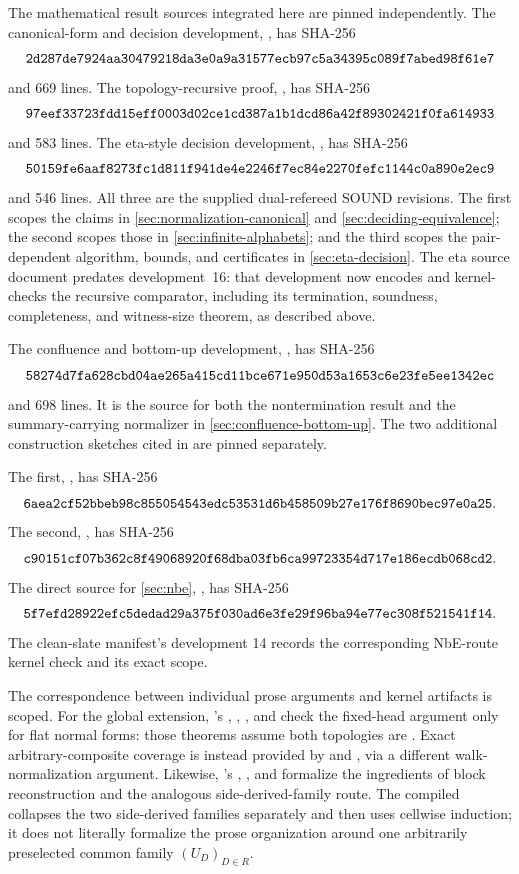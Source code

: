 The mathematical result sources integrated here are pinned independently.  The
canonical-form and decision development, , has
SHA-256
\[
\texttt{2d287de7924aa30479218da3e0a9a31577ecb97c5a34395c089f7abed98f61e7}
\]
and 669 lines.  The topology-recursive proof,
, has SHA-256
\[
\texttt{97eef33723fdd15eff0003d02ce1cd387a1b1dcd86a42f89302421f0fa614933}
\]
and 583 lines.  The eta-style decision development,
, has SHA-256
\[
\texttt{50159fe6aaf8273fc1d811f941de4e2246f7ec84e2270fefc1144c0a890e2ec9}
\]
and 546 lines.  All three are the supplied dual-refereed SOUND revisions.  The
first scopes the claims in \autoref{sec:normalization-canonical} and
\autoref{sec:deciding-equivalence}; the second scopes those in
\autoref{sec:infinite-alphabets}; and the third scopes the pair-dependent
algorithm, bounds, and certificates in \autoref{sec:eta-decision}.  The eta
source document predates development~16: that development now encodes and
kernel-checks the recursive comparator, including its termination, soundness,
completeness, and witness-size theorem, as described above.

The confluence and bottom-up development, , has
SHA-256
\[
\texttt{58274d7fa628cbd04ae265a415cd11bce671e950d53a1653c6e23fe5ee1342ec}
\]
and 698 lines.  It is the source for both the nontermination result and the
summary-carrying normalizer in \autoref{sec:confluence-bottom-up}.  The two
additional construction sketches cited in
 are pinned separately.

The first, , has SHA-256
\[
\texttt{6aea2cf52bbeb98c855054543edc53531d6b458509b27e176f8690bec97e0a25}.
\]
The second, , has SHA-256
\[
\texttt{c90151cf07b362c8f49068920f68dba03fb6ca99723354d717e186ecdb068cd2}.
\]
The direct source for \autoref{sec:nbe}, , has SHA-256
\[
\texttt{5f7efd28922efc5dedad29a375f030ad6e3fe29f96ba94e77ec308f521541f14}.
\]
The clean-slate manifest's development 14 records the corresponding NbE-route
kernel check and its exact scope.

The correspondence between individual prose arguments and kernel artifacts is
scoped.  For the global extension, 's
, , , and  check the
fixed-head argument only for flat normal forms: those theorems assume both
topologies are .  Exact arbitrary-composite coverage is instead
provided by  and
, via a different walk-normalization
argument.  Likewise, 's ,
, and  formalize the ingredients of
block reconstruction and the analogous side-derived-family route.  The
compiled  collapses the two side-derived families
separately and then uses cellwise induction; it does not literally formalize
the prose organization around one arbitrarily preselected common family
\((U_D)_{D\in R}\).

